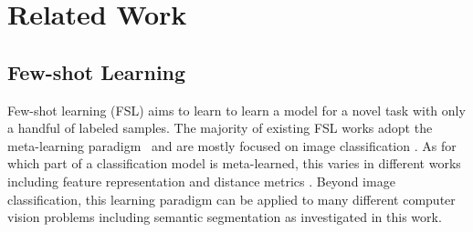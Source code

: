 \documentclass[10pt,twocolumn,letterpaper]{article}
\begin{document}
\vspace{-0.1cm}
\section{Related Work}





\subsection{Few-shot Learning} 

Few-shot learning (FSL) aims to learn to learn a model for a novel task with only a handful of labeled samples. 
The majority of existing FSL works adopt the meta-learning paradigm~\cite{schmidhuber1987evolutionary}
and are mostly focused on image classification \cite{vinyals2016matching,finn2017model,snell2017prototypical,cai2018memory,sung2018learning,gidaris2018dynamic,liu2019prototype,su2020does,goldblum2020unraveling}.
As for which part of a classification model is meta-learned, this  varies in different works including
feature representation \cite{snell2017prototypical}
and distance metrics  \cite{sung2018learning}.
Beyond image classification, this learning paradigm can be applied to many different computer vision problems including semantic segmentation as investigated in this work.
\end{document}
